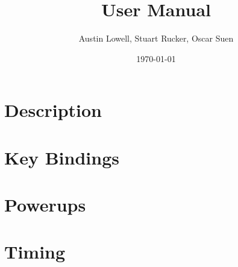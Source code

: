 \documentclass[12pt]{article}
\title{User Manual}
\author{Austin Lowell, Stuart Rucker, Oscar Suen}
\date{\today}
\begin{document}
\maketitle
\section{Description}

\section{Key Bindings}

\section{Powerups}

\section{Timing}
\end{document}
